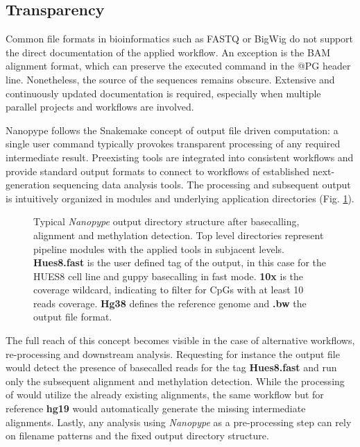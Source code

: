 \subsection{Transparency}
\label{subsec:nanopype:transparency}

Common file formats in bioinformatics such as FASTQ or BigWig do not support the direct documentation of the applied workflow. An exception is the BAM alignment format, which can preserve the executed command in the @PG header line. Nonetheless, the source of the sequences remains obscure. Extensive and continuously updated documentation is required, especially when multiple parallel projects and workflows are involved.

Nanopype follows the Snakemake concept of output file driven computation: a single user command typically provokes transparent processing of any required intermediate result. Preexisting tools are integrated into consistent workflows and provide standard output formats to connect to workflows of established next-generation sequencing data analysis tools. The processing and subsequent output is intuitively organized in modules and underlying application directories (Fig. \ref{fig:nanopype:dir_tree}).

\begin{figure}[h]
	\centering
	\begin{minipage}{.7\linewidth}
	\end{minipage}
	\captionsetup{format=plain}
	\caption[Typical Nanopype output directory]{Typical \textit{Nanopype} output directory structure after basecalling, alignment and methylation detection. Top level directories represent pipeline modules with the applied tools in subjacent levels. \textbf{Hues8.fast} is the user defined tag of the output, in this case for the HUES8 cell line and guppy basecalling in fast mode. \textbf{10x} is the coverage wildcard, indicating to filter for CpGs with at least 10 reads coverage. \textbf{Hg38} defines the reference genome and \textbf{.bw} the output file format.}
	\label{fig:nanopype:dir_tree}
\end{figure}

The full reach of this concept becomes visible in the case of alternative workflows, re-processing and downstream analysis. Requesting for instance the output file  would detect the presence of basecalled reads for the tag \textbf{Hues8.fast} and run only the subsequent alignment and methylation detection. While the processing of  would utilize the already existing alignments, the same workflow but for reference \textbf{hg19} would automatically generate the missing intermediate alignments.
Lastly, any analysis using \textit{Nanopype} as a pre-processing step can rely on filename patterns and the fixed output directory structure.





